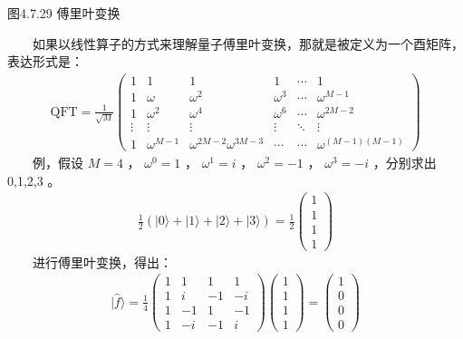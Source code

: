 \documentclass[a4paper,11pt,english]{sphinxmanual}
\begin{document}
\begin{center}图4.7.29 傅里叶变换
\end{center}
\sphinxAtStartPar
  如果以线性算子的方式来理解量子傅里叶变换，那就是被定义为一个酉矩阵，表达形式是：
\begin{equation*}
\begin{split}\mathrm{QFT}=\frac{1}{\sqrt{M}}\left(\begin{array}{cccccc} 1 & 1 & 1 & 1 & \cdots & 1 \\ 1 & \omega & \omega^{2} & \omega^{3} & \cdots & \omega^{M-1} \\ 1 & \omega^{2} & \omega^{4} & \omega^{6} & \cdots & \omega^{2 M-2} \\ \vdots & \vdots & \vdots & \vdots & \ddots & \vdots \\ 1 & \omega^{M-1} & \omega^{2 M-2} \omega^{3 M-3} & \cdots& \cdots & \omega^{(M-1)(M-1)} \end{array}\right)\end{split}
\end{equation*}
\sphinxAtStartPar
  例，假设  \(M=4\) ，  \(\omega^{0}=1\) ， \(\omega^{1}=i\) ，  \(\omega^{2}=-1\) ， \(\omega^{3}=-i\) ，分别求出 0,1,2,3 。
\begin{equation*}
\begin{split}\frac{1}{2}(|0\rangle+|1\rangle+|2\rangle+|3\rangle)=\frac{1}{2}\left(\begin{array}{l} 1 \\ 1 \\ 1 \\ 1 \end{array}\right)\end{split}
\end{equation*}
\sphinxAtStartPar
  进行傅里叶变换，得出：
\begin{equation*}
\begin{split}|\hat{f}\rangle=\frac{1}{4}\left(\begin{array}{cccc} 1 & 1 & 1 & 1 \\ 1 & i & -1 & -i \\ 1 & -1 & 1 & -1 \\ 1 & -i & -1 & i \end{array}\right)\left(\begin{array}{l} 1 \\ 1 \\ 1 \\ 1 \end{array}\right)=\left(\begin{array}{l} 1 \\ 0 \\ 0 \\ 0 \end{array}\right)\end{split}
\end{equation*}
\end{document}
